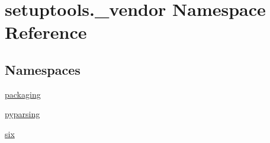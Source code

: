 \hypertarget{namespacesetuptools_1_1__vendor}{}\section{setuptools.\+\_\+vendor Namespace Reference}
\label{namespacesetuptools_1_1__vendor}
\subsection*{Namespaces}
\begin{DoxyCompactItemize}
\item 
 \hyperlink{namespacesetuptools_1_1__vendor_1_1packaging}{packaging}
\item 
 \hyperlink{namespacesetuptools_1_1__vendor_1_1pyparsing}{pyparsing}
\item 
 \hyperlink{namespacesetuptools_1_1__vendor_1_1six}{six}
\end{DoxyCompactItemize}
